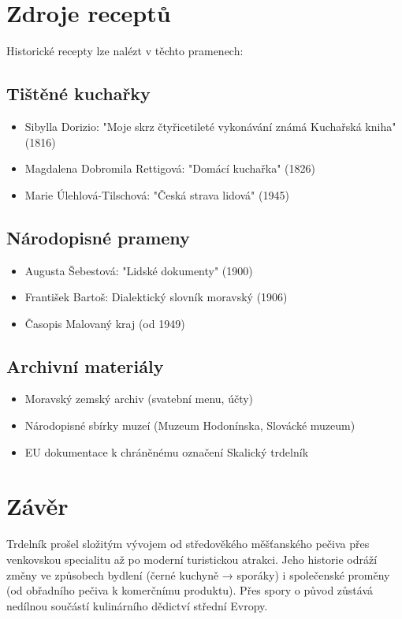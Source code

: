 \documentclass[a5paper,10pt]{book}
\begin{document}
\chapter{Zdroje receptů}
Historické recepty lze nalézt v těchto pramenech:

\section{Tištěné kuchařky}
\begin{itemize}
\item Sibylla Dorizio: "Moje skrz čtyřicetileté vykonávání známá Kuchařská kniha" (1816)
\item Magdalena Dobromila Rettigová: "Domácí kuchařka" (1826)
\item Marie Úlehlová-Tilschová: "Česká strava lidová" (1945)
\end{itemize}

\section{Národopisné prameny}
\begin{itemize}
\item Augusta Šebestová: "Lidské dokumenty" (1900)
\item František Bartoš: Dialektický slovník moravský (1906)
\item Časopis Malovaný kraj (od 1949)
\end{itemize}

\section{Archivní materiály}
\begin{itemize}
\item Moravský zemský archiv (svatební menu, účty)
\item Národopisné sbírky muzeí (Muzeum Hodonínska, Slovácké muzeum)
\item EU dokumentace k chráněnému označení Skalický trdelník
\end{itemize}

\chapter{Závěr}

Trdelník prošel složitým vývojem od středověkého měšťanského pečiva přes venkovskou specialitu až po moderní turistickou atrakci. Jeho historie odráží změny ve způsobech bydlení (černé kuchyně → sporáky) i společenské proměny (od obřadního pečiva k komerčnímu produktu). Přes spory o původ zůstává nedílnou součástí kulinárního dědictví střední Evropy.

  
\end{document}
